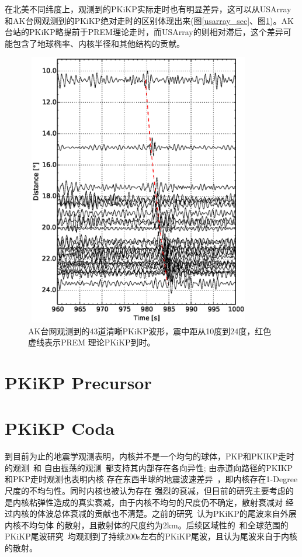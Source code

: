 在北美不同纬度上，观测到的PKiKP实际走时也有明显差异，这可以从USArray和AK台网观测到的PKiKP绝对走时的区别体现出来(图\ref{usarray_sec}、图\ref{ak_sec})。AK台站的PKiKP略提前于PREM理论走时，而USArray的则相对滞后，这个差异可能包含了地球椭率、内核半径和其他结构的贡献。

\begin{figure}[!ht]
	\centering
	\includegraphics[width=10cm,height=12cm]{fig/chap3/ak_sec.eps}
	\caption{AK台网观测到的43道清晰PKiKP波形，震中距从10度到24度，红色虚线表示PREM%
理论PKiKP到时。}
	\label{ak_sec}
\end{figure}

\newpage

\section{PKiKP Precursor}

\newpage

\section{PKiKP Coda}


到目前为止的地震学观测表明，内核并不是一个均匀的球体，PKP和PKIKP走时的观测~\citep{Creager1992}和
自由振荡的观测~\citep{Tromp1993}都支持其内部存在各向异性; 由赤道向路径的PKIKP和PKP走时观测也表明内核
存在东西半球的地震波速差异~\citep{Tanaka1997}，即内核存在1-Degree尺度的不均匀性。同时内核也被认为存在
强烈的衰减，但目前的研究主要考虑的是内核粘弹性造成的真实衰减，由于内核不均匀的尺度仍不确定，散射衰减对
经过内核的体波总体衰减的贡献也不清楚。之前的研究~\citep{Vidale2000}认为PKiKP的尾波来自外层内核不均匀体
的散射，且散射体的尺度约为2km。后续区域性的~\citep{Poupinet2004}和全球范围的PKiKP尾波研究~\citep{Koper2004}均观测到了持续200s左右的PKiKP尾波，且认为尾波来自于内核的散射。

